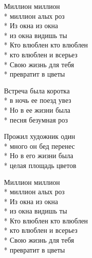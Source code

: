 \begin{minipage}{\linewidth}
\hspace*{1.5em}Миллион миллион\\*
\hspace*{1.5em}миллион алых роз\\*
\hspace*{1.5em}Из окна из окна\\*
\hspace*{1.5em}из окна видишь ты\\*
\hspace*{1.5em}Кто влюблен кто влюблен\\*
\hspace*{1.5em}кто влюблен и всерьез\\*
\hspace*{1.5em}Свою жизнь для тебя\\*
\hspace*{1.5em}превратит в цветы\\
\end{minipage}\par\medskip\nobreak

\medskip

\begin{minipage}{\linewidth}
Встреча была коротка\\*
в ночь ее поезд увез\\*
Но в ее жизни была\\*
песня безумная роз\\
\end{minipage}\par\medskip\nobreak

\medskip

\begin{minipage}{\linewidth}
Прожил художник один\\*
много он бед перенес\\*
Но в его жизни была\\*
целая площадь цветов\\
\end{minipage}\par\medskip\nobreak

\medskip

\begin{minipage}{\linewidth}
\hspace*{1.5em}Миллион миллион\\*
\hspace*{1.5em}миллион алых роз\\*
\hspace*{1.5em}Из окна из окна\\*
\hspace*{1.5em}из окна видишь ты\\*
\hspace*{1.5em}Кто влюблен кто влюблен\\*
\hspace*{1.5em}кто влюблен и всерьез\\*
\hspace*{1.5em}Свою жизнь для тебя\\*
\hspace*{1.5em}превратит в цветы\\
\end{minipage}

